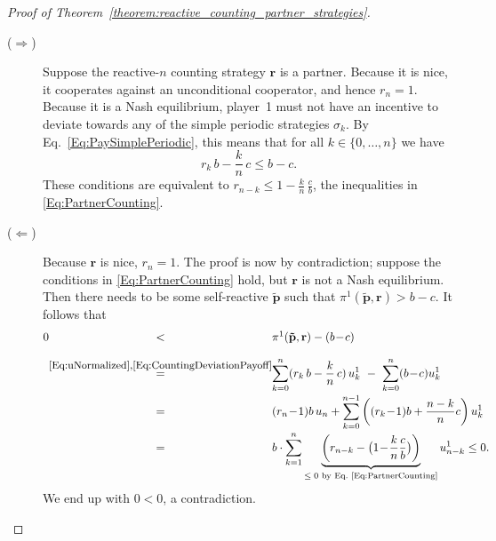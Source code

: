 \documentclass[11pt]{article}
\theoremstyle{plainCl1}
\theoremstyle{plainCl2}
\begin{document}
\begin{proof}[Proof of Theorem~\ref{theorem:reactive_counting_partner_strategies}] ~
\begin{description}
\item[\normalfont ($\Rightarrow$)]
Suppose the reactive-$n$ counting strategy $\mathbf{r}$ is a partner.
Because it is nice, it cooperates against an unconditional cooperator, and hence $r_n\!=\!1$. 
Because it is a Nash equilibrium, player~1 must not have an incentive to deviate towards any of the simple periodic strategies $\sigma_k$. By Eq.~\eqref{Eq:PaySimplePeriodic}, this means that for all $k\!\in\!\{0,\ldots,n\}$ we have
\begin{equation}
 r_k\,b - \frac{k}{n}\,c \le b\!-\!c.
\end{equation}
These conditions are equivalent to $r_{n-k} \le 1\!-\!\frac{k}{n}\,\frac{c}{b}$, the inequalities in \eqref{Eq:PartnerCounting}.

\item[\normalfont ($\Leftarrow$)] Because $\mathbf{r}$ is nice, $r_n\!=\!1$. The proof is now by contradiction; suppose the conditions  in \eqref{Eq:PartnerCounting} hold, but $\mathbf{r}$ is not a Nash equilibrium. 
Then there needs to be some self-reactive  $\mathbf{\tilde p}$ such that $\pi^1(\mathbf{\tilde p},\mathbf{r}) > b\!-\!c$. It follows that
\begin{equation} \label{Eq:AkinPartnerArgument}
\setlength{\arraycolsep}{0mm}
\begin{array}{rcl}
0	&<	
	&\pi^1(\mathbf{\tilde p},\mathbf{r}) - (b\!-\!c)\\[0.4cm]
	
	&\stackrel{\mbox{\small \eqref{Eq:uNormalized},\eqref{Eq:CountingDeviationPayoff}}}{=}  
	&\displaystyle \sum_{k=0}^n  (r_k\,b - \frac{k}{n}\,c) \,u^1_k ~-~ \sum_{k=0}^n (b\!-\!c)u^1_k\\[0.4cm]
	
	&=
	&\displaystyle (r_n\!-\!1)b\, u_n + \sum_{k=0}^{n-1} \left((r_k\!-\!1)b + \frac{n-k}{n}c\right)u^1_k\\[0.4cm]
	
	&=
	& \displaystyle b\cdot \sum_{k=1}^{n}  \underbrace{\left( r_{n-k}-\big(1\!-\! \frac{k}{n}\frac{c}{b}\big)\right)}_\text{$\le 0$ by Eq.~\eqref{Eq:PartnerCounting}} u^1_{n-k} \le 0. 
\end{array}
\end{equation}
We end up with $0\!<\!0$, a contradiction.
\end{description}
\end{proof}
\end{document}
